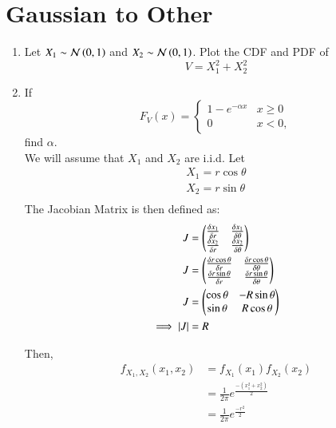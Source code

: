 \documentclass[journal,12pt,twocolumn]{IEEEtran}
\renewcommand\thesection{\arabic{section}}
\begin{document}
\section{Gaussian to Other}
\begin{enumerate}[label=\thesection.\arabic*
,ref=\thesection.\theenumi]
\item
Let $X_1 \sim  \mathcal{N}\left(0,1\right)$ and $X_2 \sim  \mathcal{N}\left(0,1\right)$. Plot the CDF and PDF of
%
\begin{equation}
V = X_1^2 + X_2^2
\end{equation}
%
%
%


\item
If
%
\begin{equation}
F_{V}(x) = 
\begin{cases}
1 - e^{-\alpha x} & x \geq 0 \\
0 & x < 0,
\end{cases}
\end{equation}
%
find $\alpha$.
%
\\
\solution We will assume that $X_1$ and $X_2$ are i.i.d. 
Let
\begin{align}
    X_1 = r \cos{\theta} \\
    X_2 = r \sin{\theta} \\
\end{align}
 The Jacobian Matrix is then defined as: 
 \begin{align}
    J     & = \begin{pmatrix}\frac{\delta x_1}{\delta r}    & \frac{\delta x_1}{\delta \theta} \\ \frac{\delta x_2}{\delta r} & \frac{\delta x_2}{\delta \theta}\end{pmatrix}\\
    J &=  \begin{pmatrix}\frac{\delta r \cos{\theta}}{\delta r} & \frac{\delta  r \cos{\theta}}{\delta \theta} \\ \frac{\delta r \sin{\theta}}{\delta r}  & \frac{\delta r \sin{\theta}}{\delta \theta}\end{pmatrix}\\
    J    & = \begin{pmatrix}\cos\theta    & -R\sin\theta    \\ \sin\theta & R\cos\theta\end{pmatrix} \\
   \implies |J|          & = R
 \end{align}


Then, 
\begin{align}
    f_{X_1,X_2}(x_1,x_2) &= f_{X_1}(x_1)f_{X_2}(x_2) \\
    &= \frac{1}{2\pi} e^{\frac{-(x_1^2+x_2^2)}{2}} \\
    &= \frac{1}{2\pi} e^{\frac{-r^2}{2}}
\end{align}


\end{enumerate}
\end{document}
